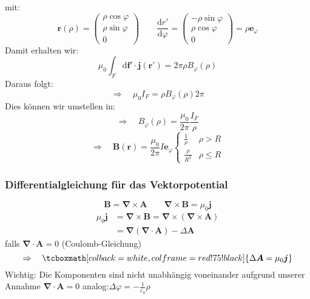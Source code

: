 \documentclass[titlepage,11pt,a4paper,ngerman]{report}
\newcommand{\tx}[1]{\textrm{#1}}
\newcommand{\dd}{\tx{d}}
\newcommand{\casess}[4]{\left\{ \begin{array}{ll} {#1} & {#2} \\ {#3} & {#4} \end{array} \right.}
\renewcommand{\vec}[1]{\boldsymbol{#1}}
\renewcommand{\epsilon}{\varepsilon}
\newcommand{\vabla}{\boldsymbol{\nabla}}
\newcommand{\rmbox}[1]{\tcboxmath[colback=white,colframe=red!75!black]{#1}}
\begin{document}
mit:
\begin{equation*}
\vec{r}(\rho) = \begin{pmatrix}
\rho \cos \varphi \\ \rho \sin \varphi \\ 0
\end{pmatrix} \qquad \frac{\dd r'}{\dd \varphi} = \begin{pmatrix}
- \rho \sin \varphi \\ \rho \cos \varphi \\ 0
\end{pmatrix} = \rho \vec{e}_{\varphi}
\end{equation*}
Damit erhalten wir:
\begin{equation*}
 \mu_0 \int_{F} \dd \vec{f}' \cdot \vec{j}(\vec{r}')  = 2 \pi \rho B_{\varphi}(\rho) 
\end{equation*}
Daraus folgt:
\begin{equation*}
\Rightarrow \quad \mu_0 I_F = \rho B_{\varphi}(\rho) 2 \pi
\end{equation*}
Dies können wir umstellen in:
\begin{equation*}
\Rightarrow \quad B_{\varphi} (\rho) = \frac{\mu_0}{2 \pi} \frac{I_F}{\rho}
\end{equation*}
\begin{equation*}
\Rightarrow \quad \vec{B}(\vec{r}) = \frac{\mu_0}{2 \pi} I \vec{e}_{\varphi} \casess{\frac{1}{\rho}}{\rho > R}{\frac{\rho}{R^2}}{\rho \le R}
\end{equation*}
%
%
%
%

\subsubsection{Differentialgleichung für das Vektorpotential}

\begin{equation*}
\vec{B} = \vabla \times \vec{A} \qquad \vabla \times \vec{B} = \mu_0 \vec{j}
\end{equation*}
\begin{align*}
\mu_0 \vec{j} &= \vabla \times \vec{B} = \vabla \times (\vabla \times \vec{A})\\
&= \vabla(\vabla \cdot \vec{A}) - \Delta \vec{A}
\end{align*}
falls $ \vabla\cdot \vec{A} = 0 $ (Coulomb-Gleichung)
\begin{equation*}
\Rightarrow \quad \rmbox{\Delta \vec{A} = \mu_0 \vec{j}}
\end{equation*}
Wichtig: Die Komponenten sind nicht unabhängig voneinander aufgrund unserer Annahme $ \vabla \cdot \vec{A} = 0 $
analog:$ \Delta \varphi = - \frac{1}{\epsilon_0} \rho $
\end{document}
